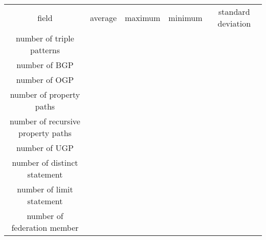 \begin{center}
    \begin{tabular}{|*{5}{c|}}
     \hline
     field & average & maximum & minimum & standard deviation \\ 
     number of triple patterns & {} & {} & {} & {} \\ 
     number of BGP & {} & {} & {} & {} \\ 
     number of OGP & {} & {} & {} & {} \\ 
     number of property paths & {} & {} & {} & {} \\ 
     number of recursive property paths & {} & {} & {} & {} \\ 
     number of UGP & {} & {} & {} & {} \\ 
     number of distinct statement & {} & {} & {} & {} \\ 
     number of limit statement & {} & {} & {} & {} \\  
     number of federation member & {} & {} & {} & {} \\  
     \hline
    \end{tabular}
\end{center}